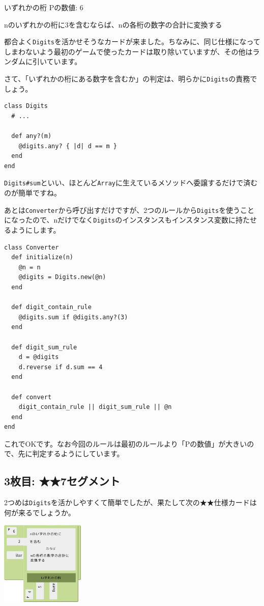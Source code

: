 \documentclass[index]{subfiles}
\begin{document}
\begin{itembox}[l]{いずれかの桁}
Pの数値: 6

nのいずれかの桁に3を含むならば、nの各桁の数字の合計に変換する
\end{itembox}

都合よく\verb+Digits+を活かせそうなカードが来ました。ちなみに、同じ仕様になってしまわないよう最初のゲームで使ったカードは取り除いていますが、その他はランダムに引いています。

さて、「いずれかの桁にある数字を含むか」の判定は、明らかに\verb+Digits+の責務でしょう。

\begin{lstlisting}
class Digits
  # ...

  def any?(m)
    @digits.any? { |d| d == m }
  end
end
\end{lstlisting}

\verb+Digits#sum+といい、ほとんど\verb+Array+に生えているメソッドへ委譲するだけで済むのが簡単ですね。

あとは\verb+Converter+から呼び出すだけですが、2つのルールから\verb+Digits+を使うことになったので、nだけでなく\verb+Digits+のインスタンスもインスタンス変数に持たせるようにします。

\begin{lstlisting}
class Converter
  def initialize(n)
    @n = n
    @digits = Digits.new(@n)
  end

  def digit_contain_rule
    @digits.sum if @digits.any?(3)
  end

  def digit_sum_rule
    d = @digits
    d.reverse if d.sum == 4
  end

  def convert
    digit_contain_rule || digit_sum_rule || @n
  end
end
\end{lstlisting}

これでOKです。なお今回のルールは最初のルールより「Pの数値」が大きいので、先に判定するようにしています。

  \subsection{3枚目: ★★7セグメント}

2つめは\verb+Digits+を活かしやすくて簡単でしたが、果たして次の★★仕様カードは何が来るでしょうか。

\begin{center}
  \includegraphics[height=4cm]{image/212_replay_2_2.png}
\end{center}
\end{document}
